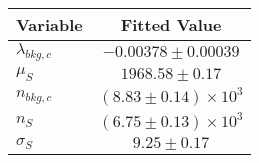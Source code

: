 \begin{tabular}[t]{lc}
\hline
Variable &Fitted Value\\
\hline\hline
$\lambda_{bkg,c}$&$-0.00378\pm0.00039$\\
\hline
$\mu_{S}$&$1968.58\pm0.17$\\
\hline
$n_{bkg,c}$&$(8.83\pm0.14)\times 10^3$\\
\hline
$n_{S}$&$(6.75\pm0.13)\times 10^3$\\
\hline
$\sigma_{S}$&$9.25\pm0.17$\\
\hline
\end{tabular}